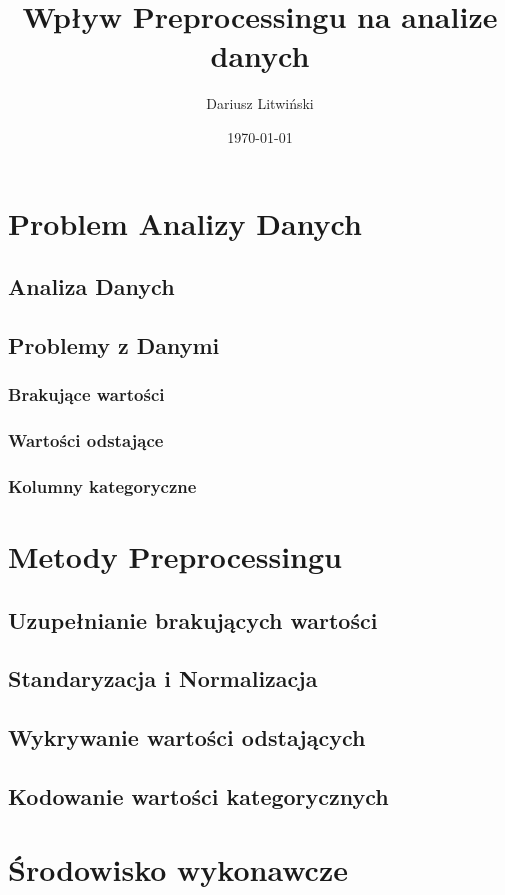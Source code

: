 \documentclass{article}
\title{Wpływ Preprocessingu na analize danych}
\author{Dariusz Litwiński}
\date{\today}
\begin{document}
\maketitle
\section{Problem Analizy Danych}

\subsection{Analiza Danych}
\subsection{Problemy z Danymi}
\subsubsection{Brakujące wartości}
\subsubsection{Wartości odstające}
\subsubsection{Kolumny kategoryczne}


\section{Metody Preprocessingu}
\subsection{Uzupełnianie brakujących wartości}
\subsection{Standaryzacja i Normalizacja}
\subsection{Wykrywanie wartości odstających}
\subsection{Kodowanie wartości kategorycznych}

\section{Środowisko wykonawcze}
\end{document}
